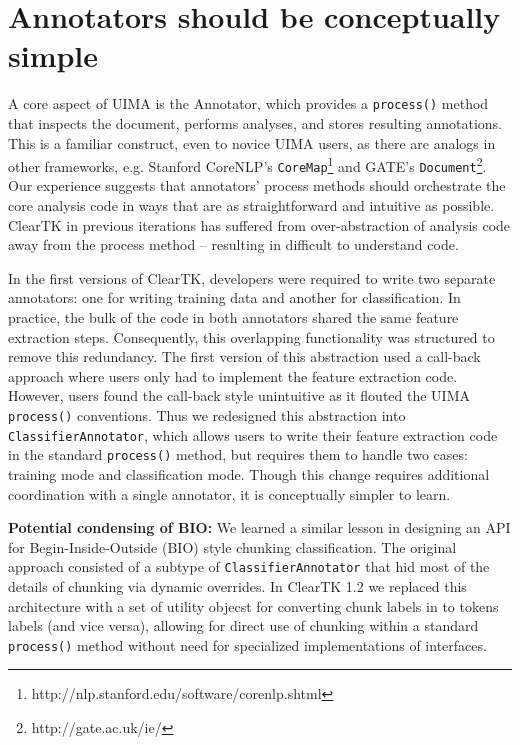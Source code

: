 \documentclass[10pt, a4paper]{article}
\newcommand{\code}[1]{\texttt{\small #1}}
\begin{document}
\section{Annotators should be conceptually simple}
\label{sec:annotators}
A core aspect of UIMA is the Annotator, which provides a \code{process()} method that inspects the document, performs analyses, and stores resulting annotations.  This is a familiar construct, even to novice UIMA users, as there are analogs in other frameworks, e.g. Stanford CoreNLP's \code{CoreMap}\footnote{http://nlp.stanford.edu/software/corenlp.shtml} and GATE's \code{Document}\footnote{http://gate.ac.uk/ie/}.  Our experience suggests that annotators' process methods should orchestrate the core analysis code in ways that are as straightforward and intuitive as possible.  ClearTK in previous iterations has suffered from over-abstraction of analysis code away from the process method -- resulting in difficult to understand code.

In the first versions of ClearTK, developers were required to write two separate annotators: one for writing training data and another for classification.  In practice, the bulk of the code in both annotators shared the same feature extraction steps.  Consequently, this overlapping functionality was structured to remove this redundancy.  The first version of this abstraction used a call-back approach where users only had to implement the feature extraction code.  However, users found the call-back style unintuitive as it flouted the UIMA \code{process()} conventions.  
Thus we redesigned this abstraction into \code{ClassifierAnnotator}, which allows users to write their feature extraction code in the standard \code{process()} method, but requires them to handle two cases: training mode and classification mode.  Though this change requires additional coordination with a single annotator, it is conceptually simpler to learn.

\textbf{Potential condensing of BIO:}  We learned a similar lesson in designing an API for Begin-Inside-Outside (BIO) style chunking classification.  The original approach consisted of a subtype of \code{ClassifierAnnotator} that hid most of the details of chunking via dynamic overrides.  In ClearTK 1.2 we replaced this architecture with a set of utility objecst for converting chunk labels in to tokens labels (and vice versa), allowing for direct use of chunking within a standard \code{process()} method without need for specialized implementations of interfaces.
\end{document}
